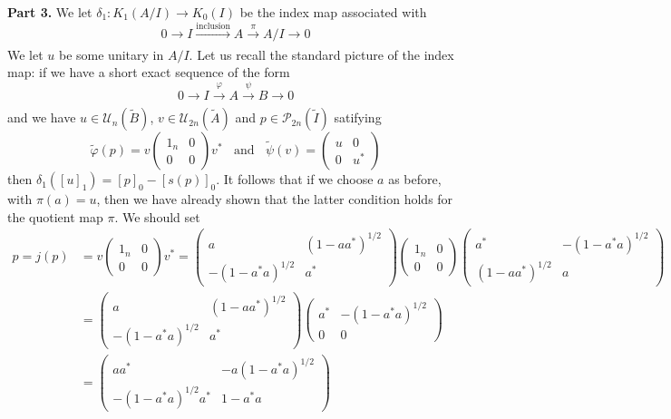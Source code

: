 \documentclass[aps,pra,showpacs,notitlepage,onecolumn,superscriptaddress,nofootinbib]{revtex4-1}
\theoremstyle{definition}
\begin{document}
\noindent \textbf{Part 3.} We let $\delta_1 : K_1(A/I) \rightarrow K_0(I)$ be the index map associated with
\begin{equation}
  0 \longrightarrow I \xrightarrow[]{\text{inclusion}} A \xrightarrow[]{\pi} A/I \longrightarrow 0
\end{equation}
We let $u$ be some unitary in $A/I$. Let us recall the standard picture of the index map: if we have a
short exact sequence of the form
\begin{equation}
  0 \longrightarrow I \xrightarrow[]{\varphi} A \xrightarrow[]{\psi} B \longrightarrow 0
\end{equation}
and we have $u \in \mathcal{U}_n(\widetilde{B})$, $v \in \mathcal{U}_{2n}(\widetilde{A})$ and $p \in \mathcal{P}_{2n}(\widetilde{I})$ satifying
\begin{equation}
  \widetilde{\varphi}(p) = v \begin{pmatrix} 1_n & 0 \\ 0 & 0 \end{pmatrix} v^{*} \ \ \ \ \text{and} \ \ \ \ \widetilde{\psi}(v) = \begin{pmatrix} u & 0 \\ 0 & u^{*} \end{pmatrix}
\end{equation}
then $\delta_1([u]_1) = [p]_0 - [s(p)]_0$. It follows that if we choose $a$ as before, with $\pi(a) = u$, then we have already shown
that the latter condition holds for the quotient map $\pi$. We should set
\begin{align}
  p = j(p) &= v \begin{pmatrix} 1_n & 0 \\ 0 & 0 \end{pmatrix} v^{*} = \begin{pmatrix} a &  (1 - a a^{*})^{1/2} \\ -(1 - a^{*} a)^{1/2} & a^{*} \end{pmatrix} \begin{pmatrix} 1_n & 0 \\ 0 & 0 \end{pmatrix} \begin{pmatrix} a^{*} &   -(1 - a^{*} a)^{1/2} \\ (1 - a a^{*})^{1/2}  & a \end{pmatrix}
  \\ & = \begin{pmatrix} a &  (1 - a a^{*})^{1/2} \\ -(1 - a^{*} a)^{1/2} & a^{*} \end{pmatrix} \begin{pmatrix} a^{*} &   -(1 - a^{*} a)^{1/2} \\ 0  & 0 \end{pmatrix}
  \\ & = \begin{pmatrix} a a^{*} & -a(1 - a^{*} a)^{1/2} \\ -(1 - a^{*} a)^{1/2} a^{*} & 1 - a^{*} a \end{pmatrix}
\end{align}
\end{document}
